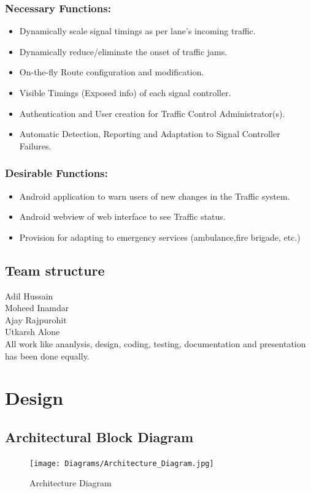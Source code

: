 \documentclass[twoside,a4paper,12pt]{book}
\begin{document}
\subsection{Necessary Functions:}
\begin{itemize}
	\item Dynamically scale signal timings as per lane's incoming traffic.
	\item Dynamically reduce/eliminate the onset of traffic jams.
	\item On-the-fly Route configuration and modification.
	\item Visible Timings (Exposed info) of each signal controller.
	\item Authentication and User creation for Traffic Control Administrator(s).
	\item Automatic Detection, Reporting and Adaptation to Signal Controller Failures.
\end{itemize}

\subsection{Desirable Functions:}
\begin{itemize}
	\item Android application to warn users of new changes in the Traffic system.
	\item Android webview of web interface to see Traffic status.
	\item Provision for adapting to emergency services (ambulance,fire brigade, etc.)
\end{itemize}

\newpage
\section{Team structure}	
Adil Hussain\\
Moheed Inamdar\\
Ajay Rajpurohit\\
Utkarsh Alone\\

All work like ananlysis, design, coding, testing, documentation and presentation has been done equally.


\chapter{Design}
\section{Architectural Block Diagram}
    \begin{figure}[!h]
    	\begin{center}
    		\texttt{[image: Diagrams/Architecture\_Diagram.jpg]}
    	\end{center}
    	\caption{Architecture Diagram}
    \end{figure}
\end{document}
